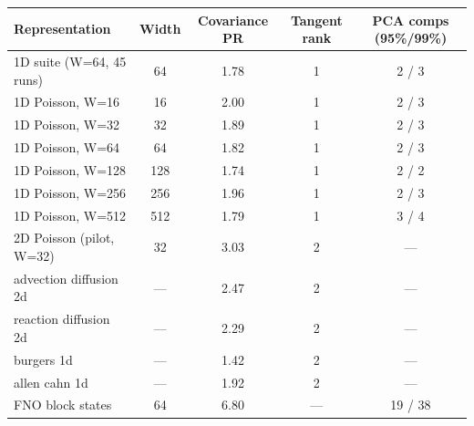 \begin{tabular}{lcccc}
\toprule
Representation & Width & Covariance PR & Tangent rank & PCA comps (95\%/99\%) \\
\midrule
1D suite (W=64, 45 runs) & 64 & 1.78 & 1 & 2 / 3 \\
1D Poisson, W=16 & 16 & 2.00 & 1 & 2 / 3 \\
1D Poisson, W=32 & 32 & 1.89 & 1 & 2 / 3 \\
1D Poisson, W=64 & 64 & 1.82 & 1 & 2 / 3 \\
1D Poisson, W=128 & 128 & 1.74 & 1 & 2 / 2 \\
1D Poisson, W=256 & 256 & 1.96 & 1 & 2 / 3 \\
1D Poisson, W=512 & 512 & 1.79 & 1 & 3 / 4 \\
2D Poisson (pilot, W=32) & 32 & 3.03 & 2 & --- \\
advection diffusion 2d & --- & 2.47 & 2 & --- \\
reaction diffusion 2d & --- & 2.29 & 2 & --- \\
burgers 1d & --- & 1.42 & 2 & --- \\
allen cahn 1d & --- & 1.92 & 2 & --- \\
FNO block states & 64 & 6.80 & --- & 19 / 38 \\
\bottomrule
\end{tabular}
